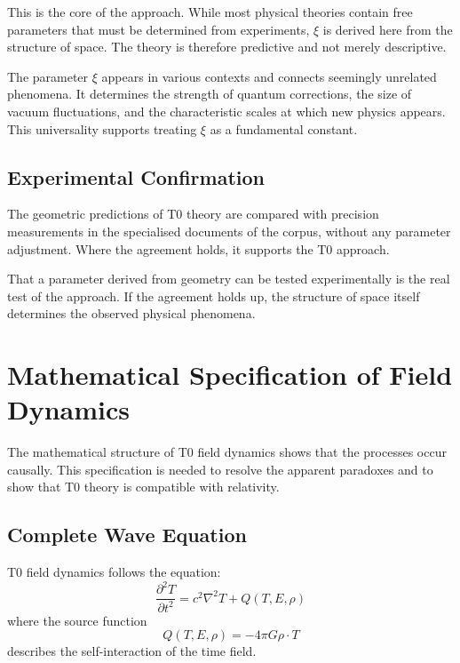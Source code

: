	This is the core of the approach. While most physical theories contain free parameters that must be determined from experiments, $\xi$ is derived here from the structure of space. The theory is therefore predictive and not merely descriptive.
	
	The parameter $\xi$ appears in various contexts and connects seemingly unrelated phenomena. It determines the strength of quantum corrections, the size of vacuum fluctuations, and the characteristic scales at which new physics appears. This universality supports treating $\xi$ as a fundamental constant.
	
	\subsection{Experimental Confirmation}
	
	The geometric predictions of T0 theory are compared with precision measurements in the specialised documents of the corpus, without any parameter adjustment. Where the agreement holds, it supports the T0 approach.
	
	That a parameter derived from geometry can be tested experimentally is the real test of the approach. If the agreement holds up, the structure of space itself determines the observed physical phenomena.
	
	\section{Mathematical Specification of Field Dynamics}
	
	The mathematical structure of T0 field dynamics shows that the processes occur causally. This specification is needed to resolve the apparent paradoxes and to show that T0 theory is compatible with relativity.
	
	\subsection{Complete Wave Equation}
	
	T0 field dynamics follows the equation:
	\begin{equation}
		\frac{\partial^2 T}{\partial t^2} = c^2\nabla^2 T + Q(T, E, \rho) \label{eq:wave_equation}
	\end{equation}
	where the source function
	\begin{equation}
		Q(T, E, \rho) = -4\pi G \rho \cdot T
	\end{equation}
	describes the self-interaction of the time field.
	

